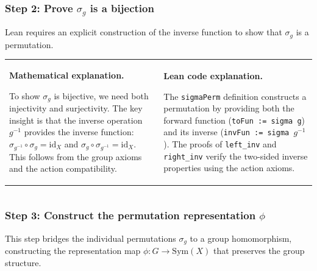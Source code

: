 \documentclass[
  12pt, %
]{assignment}
\newcommand{\leancodeurl}{}
\newcommand{\setleancodeurl}[1]{\renewcommand{\leancodeurl}{#1}}
\newcommand{\leancodefile}[3][]{%
  \setleancodeurl{#3}%
  \inputminted[fontsize=\footnotesize,breaklines,breakanywhere,tabsize=4,showspaces=false,linenos=true,#1]{lean4}{#2}%
}
\begin{document}
\subsubsection{Step 2: Prove $\sigma_g$ is a bijection}
Lean requires an explicit construction of the inverse function to show that $\sigma_g$ is a permutation.
\begin{table}[H]
	\centering
	\begin{tabular}[t]{p{}@{\hspace{2em}}p{}}

		\begin{minipage}[t]{0.47\textwidth}
			\textbf{Mathematical explanation.}

			To show $\sigma_g$ is bijective, we need both injectivity and surjectivity. The key insight is that the inverse operation $g^{-1}$ provides the inverse function: $\sigma_{g^{-1}} \circ \sigma_g = \mathrm{id}_X$ and $\sigma_g \circ \sigma_{g^{-1}} = \mathrm{id}_X$. This follows from the group axioms and the action compatibility.
		\end{minipage}
		 &
		\begin{minipage}[t]{0.47\textwidth}
			\textbf{Lean code explanation.}

			The \texttt{sigmaPerm} definition constructs a permutation by providing both the forward function (\texttt{toFun := sigma g}) and its inverse (\texttt{invFun := sigma $g^{-1}$}). The proofs of \texttt{left\_inv} and \texttt{right\_inv} verify the two-sided inverse properties using the action axioms.
		\end{minipage}
	\end{tabular}
\end{table}

\leancodefile[firstline=31,lastline=63,firstnumber=31]{../lean/GroupAction/Permutation.lean}{https://github.com/FrankieeW/GroupAction/blob/v1.2.0/lean/GroupAction/Permutation.lean}

\subsubsection{Step 3: Construct the permutation representation $\phi$}
This step bridges the individual permutations $\sigma_g$ to a group homomorphism, constructing the representation map $\phi : G \to \mathrm{Sym}(X)$ that preserves the group structure.
\end{document}
